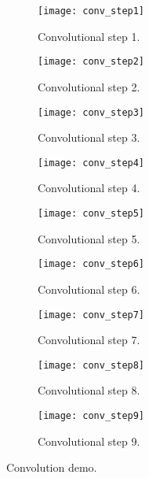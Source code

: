 \begin{figure}[h]
    \centering
    \begin{subfigure}[b]{0.325\linewidth}
        \texttt{[image: conv\_step1]}
        \caption{Convolutional step 1.}
    \end{subfigure}
    \begin{subfigure}[b]{0.325\linewidth}
        \texttt{[image: conv\_step2]}
        \caption{Convolutional step 2.}
    \end{subfigure}
    \begin{subfigure}[b]{0.325\linewidth}
        \texttt{[image: conv\_step3]}
        \caption{Convolutional step 3.}
    \end{subfigure}
    \begin{subfigure}[b]{0.325\linewidth}
        \texttt{[image: conv\_step4]}
        \caption{Convolutional step 4.}
    \end{subfigure}
    \begin{subfigure}[b]{0.325\linewidth}
        \texttt{[image: conv\_step5]}
        \caption{Convolutional step 5.}
    \end{subfigure}
    \begin{subfigure}[b]{0.325\linewidth}
        \texttt{[image: conv\_step6]}
        \caption{Convolutional step 6.}
    \end{subfigure}
    \begin{subfigure}[b]{0.325\linewidth}
        \texttt{[image: conv\_step7]}
        \caption{Convolutional step 7.}
    \end{subfigure}
    \begin{subfigure}[b]{0.325\linewidth}
        \texttt{[image: conv\_step8]}
        \caption{Convolutional step 8.}
    \end{subfigure}
    \begin{subfigure}[b]{0.325\linewidth}
        \texttt{[image: conv\_step9]}
        \caption{Convolutional step 9.}
    \end{subfigure}
    \caption{Convolution demo.}
    \label{fig:conv_demo}
\end{figure}

